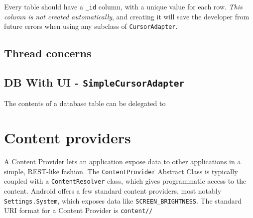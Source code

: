 \documentclass{article}
\def\cw#1{\texttt{#1}}
\begin{document}
Every table should have a \cw{\_id} column, with a unique value for each row. \emph{This column is not created automatically}, and creating it will save the developer from future errors when using any subclass of \cw{CursorAdapter}. 

\subsection{Thread concerns}

\subsection{DB With UI - \cw{SimpleCursorAdapter}}
The contents of a database table can be delegated to 

\section{Content providers}
A Content Provider lets an application expose data to other applications in a simple, REST-like fashion. The \cw{ContentProvider} Abstract Class is typically coupled with a \cw{ContentResolver} class, which gives programmatic access to the content. Android offers a few standard content providers, most notably \cw{Settings.System}, which exposes data like \cw{SCREEN\_BRIGHTNESS}. The standard URI format for a Content Provider is \cw{content//}
\end{document}
